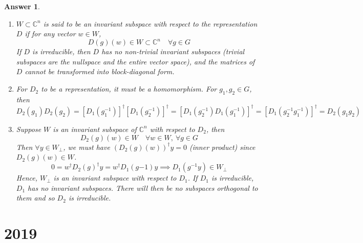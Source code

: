 \documentclass[a4paper]{article}
\newtheorem{ans}{Answer}[section]
\theoremstyle{new}
\begin{document}
\begin{ans}\leavevmode
\begin{enumerate}[label=(\alph*)]
\item $W\subset\mathbb{C}^n$ is said to be an invariant subspace with respect to the representation $D$ if for any vector $w\in W$,
$$D(g)(w)\in W\subset\mathbb{C}^n\quad\forall g\in G$$
If $D$ is irreducible, then $D$ has no non-trivial invariant subspaces (trivial subspaces are the nullspace and the entire vector space), and the matrices of $D$ cannot be transformed into block-diagonal form.
\item For $D_2$ to be a representation, it must be a homomorphism. For $g_1,g_2\in G$, then
$$D_2(g_1)D_2(g_2)=[D_1(g_1^{-1})]^\dag[D_1(g_2^{-1})]^\dag=[D_1(g_2^{-1})D_1(g_1^{-1})]^\dag=[D_1(g_2^{-1}g_1^{-1})]^\dag=D_2(g_1g_2)$$
\item Suppose $W$ is an invariant subspace of $\mathbb{C}^n$ with respect to $D_2$, then
$$D_2(g)(w)\in W\quad\forall w\in W,~\forall g\in G$$
Then $\forall y\in W_\perp$, we must have
$(D_2(g)(w))^\dag y=0$ (inner product) since $D_2(g)(w)\in W$. 
$$0=w^\dag D_2(g)^\dag y=w^\dag D_1(g{-1})y\implies D_1(g^{-1}y)\in W_\perp$$
Hence, $W_\perp$ is an invariant subspace with respect to $D_1$. If $D_1$ is irreducible, $D_1$ has no invariant subspaces. There will then be no subspaces orthogonal to them and so $D_2$ is irreducible.
\end{enumerate}
\end{ans}
\newpage
\section{2019}
\end{document}
